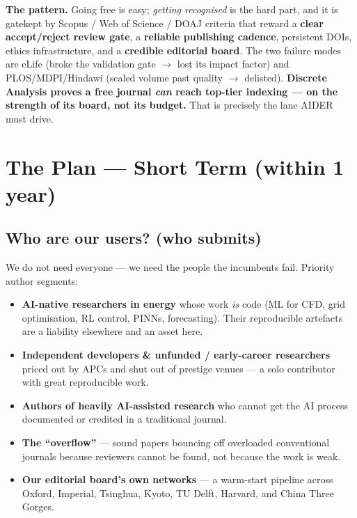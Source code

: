 \documentclass[11pt]{article}
\begin{document}
\begin{takeaway}
\textbf{The pattern.} Going free is easy; \emph{getting recognised} is the hard part, and it is gatekept by Scopus / Web of Science / DOAJ criteria that reward a \textbf{clear accept/reject review gate}, a \textbf{reliable publishing cadence}, persistent DOIs, ethics infrastructure, and a \textbf{credible editorial board}. The two failure modes are eLife (broke the validation gate $\to$ lost its impact factor) and PLOS/MDPI/Hindawi (scaled volume past quality $\to$ delisted). \textbf{Discrete Analysis proves a free journal \emph{can} reach top-tier indexing --- on the strength of its board, not its budget.} That is precisely the lane AIDER must drive.
\end{takeaway}

\section{The Plan --- Short Term (within 1 year)}

\subsection{Who are our users? (who submits)}

We do not need everyone --- we need the people the incumbents fail. Priority author segments:
\begin{itemize}
\item \textbf{AI-native researchers in energy} whose work \emph{is} code (ML for CFD, grid optimisation, RL control, PINNs, forecasting). Their reproducible artefacts are a liability elsewhere and an asset here.
\item \textbf{Independent developers \& unfunded / early-career researchers} priced out by APCs and shut out of prestige venues --- a solo contributor with great reproducible work.
\item \textbf{Authors of heavily AI-assisted research} who cannot get the AI process documented or credited in a traditional journal.
\item \textbf{The ``overflow''} --- sound papers bouncing off overloaded conventional journals because reviewers cannot be found, not because the work is weak.
\item \textbf{Our editorial board's own networks} --- a warm-start pipeline across Oxford, Imperial, Tsinghua, Kyoto, TU Delft, Harvard, and China Three Gorges.
\end{itemize}
\end{document}
